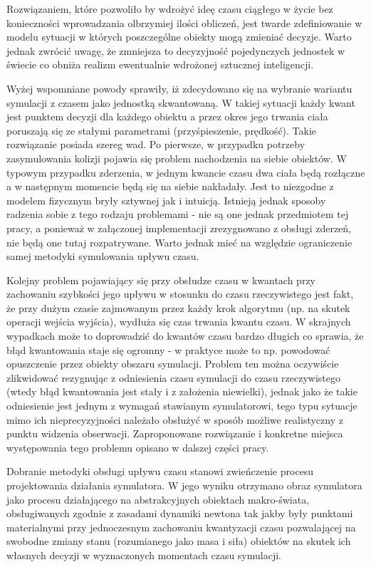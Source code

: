 {{}
\par{
Rozwiązaniem, które pozwoliło by wdrożyć ideę czasu ciągłego w życie bez konieczności wprowadzania olbrzymiej ilości obliczeń, jest twarde zdefiniowanie w modelu sytuacji w których poszczególne obiekty mogą zmieniać decyzje. Warto jednak zwrócić uwagę, że zmniejsza to decyzyjność pojedynczych jednostek w świecie co obniża realizm ewentualnie wdrożonej sztucznej inteligencji.
}
\par{
Wyżej wspomniane powody sprawiły, iż zdecydowano się na wybranie wariantu symulacji z czasem jako jednostką skwantowaną. W takiej sytuacji każdy kwant jest punktem decyzji dla każdego obiektu a przez okres jego trwania ciała poruszają się ze stałymi parametrami (przyśpieszenie, prędkość).
Takie rozwiązanie posiada szereg wad. Po pierwsze, w przypadku potrzeby zasymulowania kolizji pojawia się problem nachodzenia na siebie obiektów. W typowym przypadku zderzenia, w jednym kwancie czasu dwa ciała będą rozłączne a w następnym momencie będą się na siebie nakładały. Jest to niezgodne z modelem fizycznym bryły sztywnej jak i intuicją. Istnieją jednak sposoby radzenia sobie z tego rodzaju problemami - nie są one jednak przedmiotem tej pracy, a ponieważ w załączonej implementacji zrezygnowano z obsługi zderzeń, nie będą one tutaj rozpatrywane. Warto jednak mieć na względzie ograniczenie samej metodyki symulowania upływu czasu.
}
\par{
Kolejny problem pojawiający się przy obsłudze czasu w kwantach przy zachowaniu szybkości jego upływu w stosunku do czasu rzeczywistego jest fakt, że przy dużym czasie zajmowanym przez każdy krok algorytmu (np. na skutek operacji wejścia wyjścia), wydłuża się czas trwania kwantu czasu. W skrajnych wypadkach może to doprowadzić do kwantów czasu bardzo długich co sprawia, że błąd kwantowania staje się ogromny - w praktyce może to np. powodować opuszczenie przez obiekty obszaru symulacji.
Problem ten można oczywiście zlikwidować rezygnując z odniesienia czasu symulacji do czasu rzeczywistego (wtedy błąd kwantowania jest stały i z założenia niewielki), jednak jako że takie odniesienie jest jednym z wymagań stawianym symulatorowi, tego typu sytuacje mimo ich nieprecyzyjności należało obsłużyć w sposób możliwe realistyczny z punktu widzenia obserwacji. Zaproponowane rozwiązanie i konkretne miejsca występowania tego problemu opisano w dalszej części pracy.
}
\par{
Dobranie metodyki obsługi upływu czasu stanowi zwieńczenie procesu projektowania działania symulatora. W jego wyniku otrzymano obraz symulatora jako procesu działającego na abstrakcyjnych obiektach makro-świata, obsługiwanych zgodnie z zasadami dynamiki newtona tak jakby były punktami materialnymi przy jednoczesnym zachowaniu kwantyzacji czasu pozwalającej na swobodne zmiany stanu (rozumianego jako masa i siła) obiektów na skutek ich własnych decyzji w wyznaczonych momentach czasu symulacji.
}

}
